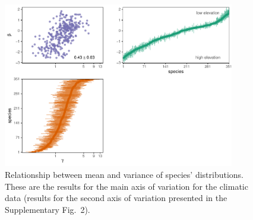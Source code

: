 \documentclass[11pt, a4paper]{article}
\begin{document}



\begin{figure}[ht]
  \centering
    \vspace{0.5cm}
    \includegraphics[width=0.9\textwidth]{figures/figure1}
    	  \vspace{0.3cm}
	   \caption{Relationship between mean and variance of species' distributions. These are the results for the main axis of variation for the climatic data (results for the second axis of variation presented in the Supplementary Fig.~2).}
      \label{fig:correlation}
\end{figure}
\end{document}
